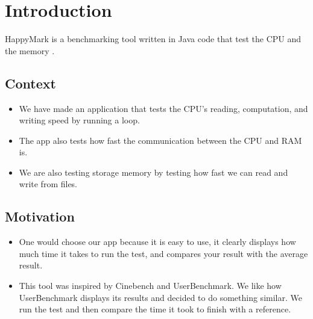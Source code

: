 \chapter{Introduction}

HappyMark is a benchmarking tool written in Java code that test the CPU and the memory .

\section{Context}

\begin{itemize}
  \item We have made an application that tests the CPU's reading, computation, and writing speed by running a loop.
  \item The app also tests how fast the communication between the CPU and RAM is.
  \item We are also testing storage memory by testing how fast we can read and write from files.
  
\end{itemize}

\section{Motivation}

\begin{itemize}
  \item One would choose our app because it is easy to use, it clearly displays how much time it takes to run the test, and compares your result with the average result.
  
  \item This tool was inspired by Cinebench and UserBenchmark. We like how UserBenchmark displays its results and decided to do something similar. We run the test and then compare the time it took to finish with a reference.

\end{itemize}
